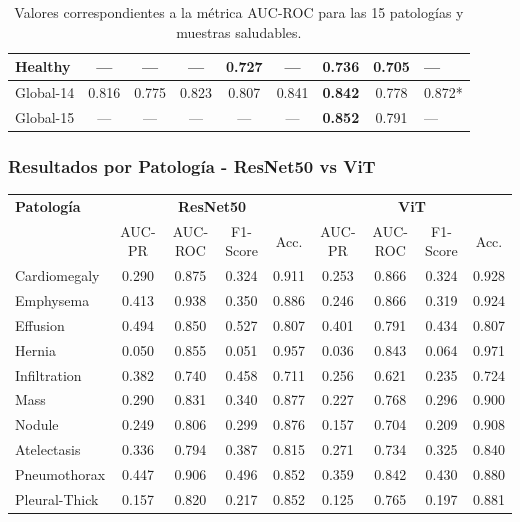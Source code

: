 \begin{frame}
\begin{table}[ht!]
\begin{tabular}{|l||c|c|c|c|c|c|c|l|}
        Healthy	        &	---	    &	---	    &	---	    &	0.727	&	---	    &\bf{0.736}	& 0.705 &	---	    \\
        \hline\hline
        Global-14	    &	0.816	&	0.775	&	0.823	&	0.807	&	0.841	&\bf{0.842}	& 0.778 &	0.872*	\\
        Global-15	    &	---	    &	---	    &	---	    &	---	    &	---	    &\bf{0.852}	& 0.791 &	---	    \\
        \hline
    \end{tabular}
    \caption{Valores correspondientes a la métrica AUC-ROC para las 15 patologías y muestras saludables.}
    \label{table_roc_auc}
\end{table}
\end{frame}

\begin{frame}
\frametitle{Resultados por Patología - ResNet50 vs ViT}
\begin{table}[ht!]
    \centering
    \tiny
    \begin{tabular}{|l||c|c|c|c||c|c|c|c|}
        \hline
        {\bf Patología} & \multicolumn{4}{c||}{\bf ResNet50} & \multicolumn{4}{c|}{\bf ViT} \\
        \cline{2-9}
         & AUC-PR & AUC-ROC & F1-Score & Acc. & AUC-PR & AUC-ROC & F1-Score & Acc. \\
        \hline\hline
        Cardiomegaly    & 0.290 & 0.875 & 0.324 & 0.911 & 0.253 & 0.866 & 0.324 & 0.928 \\
        Emphysema       & 0.413 & 0.938 & 0.350 & 0.886 & 0.246 & 0.866 & 0.319 & 0.924 \\
        Effusion        & 0.494 & 0.850 & 0.527 & 0.807 & 0.401 & 0.791 & 0.434 & 0.807 \\
        Hernia          & 0.050 & 0.855 & 0.051 & 0.957 & 0.036 & 0.843 & 0.064 & 0.971 \\
        Infiltration    & 0.382 & 0.740 & 0.458 & 0.711 & 0.256 & 0.621 & 0.235 & 0.724 \\
        Mass            & 0.290 & 0.831 & 0.340 & 0.877 & 0.227 & 0.768 & 0.296 & 0.900 \\
        Nodule          & 0.249 & 0.806 & 0.299 & 0.876 & 0.157 & 0.704 & 0.209 & 0.908 \\
        Atelectasis     & 0.336 & 0.794 & 0.387 & 0.815 & 0.271 & 0.734 & 0.325 & 0.840 \\
        Pneumothorax    & 0.447 & 0.906 & 0.496 & 0.852 & 0.359 & 0.842 & 0.430 & 0.880 \\
        Pleural-Thick   & 0.157 & 0.820 & 0.217 & 0.852 & 0.125 & 0.765 & 0.197 & 0.881 \\

\end{tabular}
\end{table}
\end{frame}
